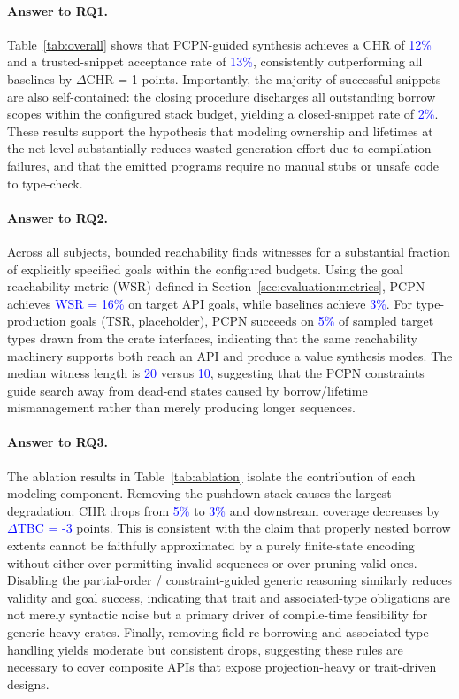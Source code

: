 \documentclass[sigconf]{acmart}
\begin{document}
\paragraph{Answer to RQ1.}
Table~\ref{tab:overall} shows that PCPN-guided synthesis achieves a CHR of \textcolor{blue}{12\%} and a trusted-snippet acceptance rate of \textcolor{blue}{13\%}, consistently outperforming all baselines by $\Delta$CHR = 1 points. Importantly, the majority of successful snippets are also self-contained: the closing procedure discharges all outstanding borrow scopes within the configured stack budget, yielding a closed-snippet rate of \textcolor{blue}{2\%}. These results support the hypothesis that modeling ownership and lifetimes at the net level substantially reduces wasted generation effort due to compilation failures, and that the emitted programs require no manual stubs or unsafe code to type-check.

\paragraph{Answer to RQ2.}
Across all subjects, bounded reachability finds witnesses for a substantial fraction of explicitly specified goals within the configured budgets. Using the goal reachability metric (WSR) defined in Section~\ref{sec:evaluation:metrics}, PCPN achieves \textcolor{blue}{WSR = 16\%} on target API goals, while baselines achieve \textcolor{blue}{3\%}. For type-production goals (TSR, placeholder), PCPN succeeds on \textcolor{blue}{5\%} of sampled target types drawn from the crate interfaces, indicating that the same reachability machinery supports both reach an API and produce a value synthesis modes. The median witness length is \textcolor{blue}{20} versus \textcolor{blue}{10}, suggesting that the PCPN constraints guide search away from dead-end states caused by borrow/lifetime mismanagement rather than merely producing longer sequences.

\paragraph{Answer to RQ3.}
The ablation results in Table~\ref{tab:ablation} isolate the contribution of each modeling component. Removing the pushdown stack causes the largest degradation: CHR drops from \textcolor{blue}{5\%} to \textcolor{blue}{3\%} and downstream coverage decreases by \textcolor{blue}{$\Delta$TBC = -3} points. This is consistent with the claim that properly nested borrow extents cannot be faithfully approximated by a purely finite-state encoding without either over-permitting invalid sequences or over-pruning valid ones. Disabling the partial-order / constraint-guided generic reasoning similarly reduces validity and goal success, indicating that trait and associated-type obligations are not merely syntactic noise but a primary driver of compile-time feasibility for generic-heavy crates. Finally, removing field re-borrowing and associated-type handling  yields moderate but consistent drops, suggesting these rules are necessary to cover composite APIs that expose projection-heavy or trait-driven designs.
\end{document}
